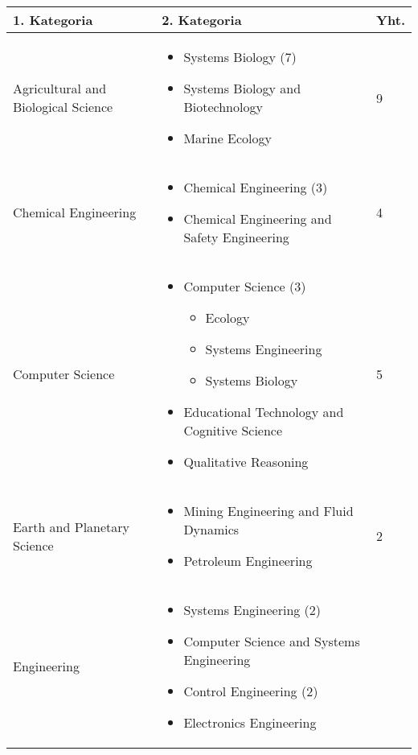 \documentclass[utf8]{gradu3}
\begin{document}
\begin{longtable}[]{|p{5cm}|p{8cm}|p{1cm}|}
    \hline
    \textbf{1. Kategoria}    & \textbf{2. Kategoria} & \textbf{Yht.} \\
    \hline
    Agricultural and Biological Science  & \begin{itemize}
        \item Systems Biology (7)
        \item Systems Biology and Biotechnology 
        \item Marine Ecology
    \end{itemize} & 9 \\
    \hline
    Chemical Engineering & \begin{itemize}
        \item Chemical Engineering (3)
        \item Chemical Engineering and Safety Engineering 
    \end{itemize} & 4 \\
    \hline
    Computer Science & \begin{itemize}
        \item Computer Science (3)
        \begin{itemize}
            \item Ecology
            \item Systems Engineering
            \item Systems Biology
        \end{itemize}
        \item Educational Technology and Cognitive Science
        \item Qualitative Reasoning
    \end{itemize} & 5 \\
    \hline
    Earth and Planetary Science & \begin{itemize}
        \item Mining Engineering and Fluid Dynamics
        \item Petroleum Engineering
    \end{itemize} & 2 \\
    \hline
    Engineering & \begin{itemize}
        \item Systems Engineering (2)
        \item Computer Science and Systems Engineering 
        \item Control Engineering (2)
        \item Electronics Engineering

\end{itemize}
\end{longtable}
\end{document}
